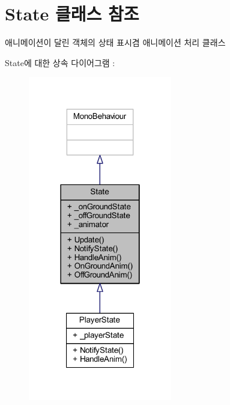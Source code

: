 \hypertarget{class_state}{}\section{State 클래스 참조}
\label{class_state}


애니메이션이 달린 객체의 상태 표시겸 애니메이션 처리 클래스  




State에 대한 상속 다이어그램 \+: \nopagebreak
\begin{figure}[H]
\begin{center}
\leavevmode
\includegraphics[width=178pt]{de/d06/class_state__inherit__graph}
\end{center}
\end{figure}


